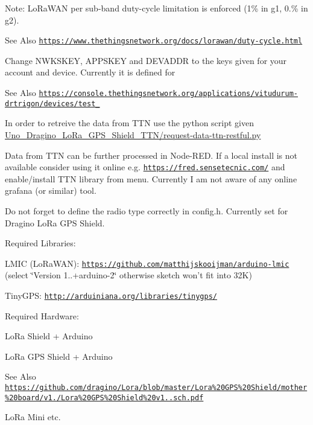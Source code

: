 Note\-: Lo\-Ra\-W\-A\-N per sub-\/band duty-\/cycle limitation is enforced (1\% in g1, 0.\% in g2). \begin{DoxySeeAlso}{See Also}
\href{https://www.thethingsnetwork.org/docs/lorawan/duty-cycle.html}{\tt https\-://www.\-thethingsnetwork.\-org/docs/lorawan/duty-\/cycle.\-html}
\end{DoxySeeAlso}
Change N\-W\-K\-S\-K\-E\-Y, A\-P\-P\-S\-K\-E\-Y and D\-E\-V\-A\-D\-D\-R to the keys given for your account and device. Currently it is defined for \begin{DoxySeeAlso}{See Also}
\href{https://console.thethingsnetwork.org/applications/vitudurum-drtrigon/devices/test_01}{\tt https\-://console.\-thethingsnetwork.\-org/applications/vitudurum-\/drtrigon/devices/test\-\_}
\end{DoxySeeAlso}
In order to retreive the data from T\-T\-N use the python script given \hyperlink{request-data-ttn-restful_8py}{Uno\-\_\-\-Dragino\-\_\-\-Lo\-Ra\-\_\-\-G\-P\-S\-\_\-\-Shield\-\_\-\-T\-T\-N/request-\/data-\/ttn-\/restful.\-py}

Data from T\-T\-N can be further processed in Node-\/\-R\-E\-D. If a local install is not available consider using it online e.\-g. \href{https://fred.sensetecnic.com/}{\tt https\-://fred.\-sensetecnic.\-com/} and enable/install T\-T\-N library from menu. Currently I am not aware of any online grafana (or similar) tool.

Do not forget to define the radio type correctly in config.\-h. Currently set for Dragino Lo\-Ra G\-P\-S Shield.

Required Libraries\-:
\begin{DoxyItemize}
\item L\-M\-I\-C (Lo\-Ra\-W\-A\-N)\-: \href{https://github.com/matthijskooijman/arduino-lmic}{\tt https\-://github.\-com/matthijskooijman/arduino-\/lmic} (select \char`\"{}\-Version 1..+arduino-\/2\char`\"{} otherwise sketch won't fit into 32\-K)
\item Tiny\-G\-P\-S\-: \href{http://arduiniana.org/libraries/tinygps/}{\tt http\-://arduiniana.\-org/libraries/tinygps/}
\end{DoxyItemize}

Required Hardware\-:
\begin{DoxyItemize}
\item Lo\-Ra Shield + Arduino
\item Lo\-Ra G\-P\-S Shield + Arduino \begin{DoxySeeAlso}{See Also}
\href{https://github.com/dragino/Lora/blob/master/Lora%20GPS%20Shield/mother%20board/v1.3/Lora%20GPS%20Shield%20v1.3.sch.pdf}{\tt https\-://github.\-com/dragino/\-Lora/blob/master/\-Lora\%20\-G\-P\-S\%20\-Shield/mother\%20board/v1.\-3/\-Lora\%20\-G\-P\-S\%20\-Shield\%20v1.\-3.\-sch.\-pdf}
\end{DoxySeeAlso}

\item Lo\-Ra Mini etc.
\end{DoxyItemize}


